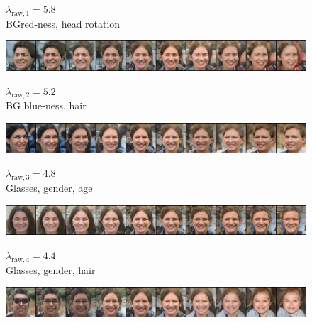 \documentclass{article}
\begin{document}
\begin{figure}[H]
  \centering
  \begin{minipage}{.18\linewidth}
      \centering
      $\lambda_{\text{raw}, 1} = 5.8$ \\
      BG\footnotemark red-ness, head rotation
  \end{minipage}%
  \hfill
  \begin{minipage}{.81\linewidth}
      \centering
      \includegraphics[width=\linewidth]{eigen/raw_gan_1.png}
  \end{minipage}
\end{figure}

\begin{figure}[H]
  \centering
  \begin{minipage}{.18\linewidth}
      \centering
      $\lambda_{\text{raw}, 2} = 5.2$ \\
      BG blue-ness, hair
  \end{minipage}%
  \hfill
  \begin{minipage}{.81\linewidth}
      \centering
      \includegraphics[width=\linewidth]{eigen/raw_gan_2.png}
  \end{minipage}
\end{figure}
  
\begin{figure}[H]
  \centering
  \begin{minipage}{.18\linewidth}
      \centering
      $\lambda_{\text{raw}, 3} = 4.8$ \\
      Glasses, gender, age
  \end{minipage}%
  \hfill
  \begin{minipage}{.81\linewidth}
      \centering
      \includegraphics[width=\linewidth]{eigen/raw_gan_3.png}
  \end{minipage}
\end{figure}

\begin{figure}[H]
  \centering
  \begin{minipage}{.18\linewidth}
      \centering
      $\lambda_{\text{raw}, 4} = 4.4$ \\
      Glasses, gender, hair
  \end{minipage}%
  \hfill
  \begin{minipage}{.81\linewidth}
      \centering
      \includegraphics[width=\linewidth]{eigen/raw_gan_4.png}
  \end{minipage}
\end{figure}
\end{document}
